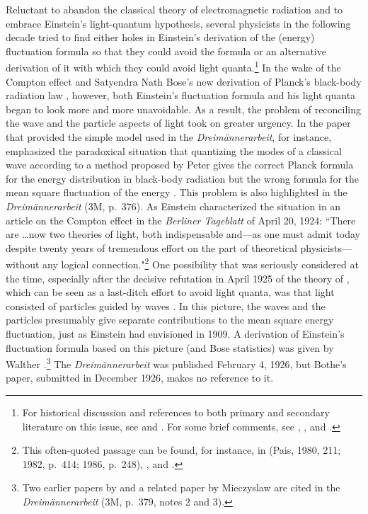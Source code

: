 \documentclass[12pt]{elsart}
\begin{document}
Reluctant to abandon the classical theory of electromagnetic radiation and to embrace Einstein's light-quantum hypothesis, several physicists in the following decade tried to find either holes in Einstein's derivation of the (energy) fluctuation formula so that they could avoid the formula or an alternative derivation of it with which they could avoid light quanta.\footnote{\label{kojevnikov}
For historical discussion and references to both primary and secondary literature on this issue, see 
\citep{Bach 1989} and \citep{Kojevnikov 1990}. For some brief comments, see \citep[p.\ 642, note 2]{Jordan 1927b}, \citep[p.\ 398, note 1]{Born and Jordan 1930}, and \citep[p.\ 220]{Jordan 1936}.} In the wake of the Compton effect \citep{Compton 1923} and Satyendra Nath Bose's new derivation of Planck's black-body radiation law \citep{Bose 1924}, however, both Einstein's fluctuation formula and his light quanta began to look more and more unavoidable. As a result, the problem of reconciling the wave and the particle aspects of light took on greater urgency. In the paper that provided the simple model used in the {\it Dreim\"annerarbeit}, for instance, \citet{Ehrenfest 1925a} emphasized the paradoxical situation that quantizing the modes of a classical wave according to a method proposed by Peter \citet{Debye 1910} gives the correct Planck formula for the energy distribution  in black-body radiation but the wrong formula for the mean square fluctuation of the energy \citep[p.\ 379]{Stachel 1986}. This problem is also highlighted in the {\it Dreim\"annerarbeit} (3M, p.\ 376). As Einstein characterized the situation in an article on the Compton effect in the  {\it Berliner Tageblatt} of April 20, 1924:  ``There are \ldots now two theories of light, both indispensable and---as one must admit today despite twenty years of tremendous effort on the part of theoretical physicists---without any logical connection."\footnote{This often-quoted passage can be found, for instance, in (Pais, 1980, 211; 1982, p.\ 414; 1986, p.\ 248), \citep[p.\ 182]{Klein 1980}, and \citep[p.\ 182]{Bach 1989}.} One possibility that was seriously considered at the time, especially after the decisive refutation  in April 1925 of the theory of \citet{BKS}, which can be seen as a last-ditch effort to avoid light quanta, was that light consisted of particles guided by waves \citep[sec.\ 4.2]{Duncan and Janssen}. In this picture, the waves and the particles presumably give separate contributions to the mean square energy fluctuation, just as Einstein had envisioned in 1909. A derivation of Einstein's fluctuation formula based on this picture (and Bose statistics) was given by Walther \citet{Bothe 1927}.\footnote{Two earlier papers by \citet{Bothe 1923, Bothe 1924} and a related paper by Mieczyslaw \citet{Wolfke 1921} are cited in the {\it Dreim\"annerarbeit} (3M, p.\ 379, notes 2 and 3).} The {\it Dreim\"annerarbeit} was published February 4, 1926, but Bothe's paper, submitted in December 1926, makes no reference to it.
\end{document}
